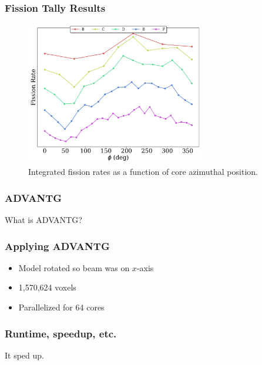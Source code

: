 \documentclass[fleqn]{beamer}
\begin{document}
\begin{frame}
\frametitle{Fission Tally Results}

\begin{figure}
\centering
\includegraphics[width = 0.7\textwidth]{totals_azi}
\caption{Integrated fission rates as a function of core azimuthal position.}
\end{figure}

\end{frame}

\begin{frame}
\frametitle{ADVANTG}

What is ADVANTG?

\end{frame}

\begin{frame}
\frametitle{Applying ADVANTG}

\begin{itemize}
\item Model rotated so beam was on $x$-axis
\item 1,570,624 voxels
\item Parallelized for 64 cores
\end{itemize}

\end{frame}

\begin{frame}
\frametitle{Runtime, speedup, etc.}

It sped up.

\end{frame}
\end{document}
